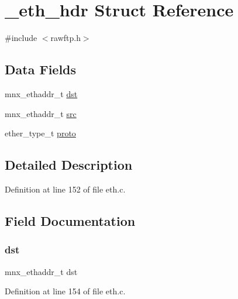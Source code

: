 \hypertarget{struct__eth__hdr}{}\section{\+\_\+eth\+\_\+hdr Struct Reference}
\label{struct__eth__hdr}


{\ttfamily \#include $<$rawftp.\+h$>$}

\subsection*{Data Fields}
\begin{DoxyCompactItemize}
\item 
mnx\+\_\+ethaddr\+\_\+t \hyperlink{struct__eth__hdr_a6262cfbb29d590f70998153351dd96cb}{dst}
\item 
mnx\+\_\+ethaddr\+\_\+t \hyperlink{struct__eth__hdr_a96824bdc9a1daeb91ebe94d82f3356cd}{src}
\item 
ether\+\_\+type\+\_\+t \hyperlink{struct__eth__hdr_a9248d85737d93150e2b253b8be531790}{proto}
\end{DoxyCompactItemize}


\subsection{Detailed Description}


Definition at line 152 of file eth.\+c.



\subsection{Field Documentation}
\hypertarget{struct__eth__hdr_a6262cfbb29d590f70998153351dd96cb}{}\label{struct__eth__hdr_a6262cfbb29d590f70998153351dd96cb} 
\subsubsection{\texorpdfstring{dst}{dst}}
{\footnotesize\ttfamily mnx\+\_\+ethaddr\+\_\+t dst}



Definition at line 154 of file eth.\+c.

\hypertarget{struct__eth__hdr_a9248d85737d93150e2b253b8be531790}{}\label{struct__eth__hdr_a9248d85737d93150e2b253b8be531790} 
